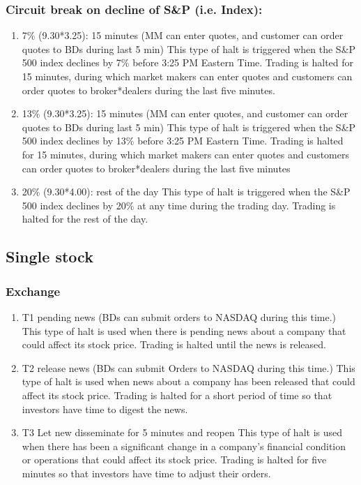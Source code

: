 \documentclass[11pt]{article}
\begin{document}
\subsubsection{Circuit break on decline of S\&P (i.e. Index):}
\label{sec:org32952db}
\begin{enumerate}
\item 7\%  (9.30*3.25): 15 minutes         (MM can enter quotes, and customer can order quotes to BDs during last 5 min)
\label{sec:org6ede6fb}
This type of halt is triggered when the S\&P 500 index declines by 7\% before 3:25 PM Eastern Time. Trading is halted for 15 minutes, during which market makers can enter quotes and customers can order quotes to broker*dealers during the last five minutes.
\item 13\% (9.30*3.25): 15 minutes         (MM can enter quotes, and customer can order quotes to BDs during last 5 min)
\label{sec:org1259ee9}
This type of halt is triggered when the S\&P 500 index declines by 13\% before 3:25 PM Eastern Time. Trading is halted for 15 minutes, during which market makers can enter quotes and customers can order quotes to broker*dealers during the last five minutes
\item 20\% (9.30*4.00): rest of the day
\label{sec:org5681668}
This type of halt is triggered when the S\&P 500 index declines by 20\% at any time during the trading day. Trading is halted for the rest of the day.
\end{enumerate}
\subsection{Single stock}
\label{sec:orgf35e5c6}
\subsubsection{Exchange}
\label{sec:org676dc25}
\begin{enumerate}
\item T1 pending news  (BDs can submit orders to NASDAQ during this time.)
\label{sec:org8b3a272}
This type of halt is used when there is pending news about a company that could affect its stock price. Trading is halted until the news is released.
\item T2 release news   (BDs can submit Orders to NASDAQ during this time.)
\label{sec:orgecbfab3}
This type of halt is used when news about a company has been released that could affect its stock price. Trading is halted for a short period of time so that investors have time to digest the news.
\item T3 Let new disseminate for 5 minutes and reopen
\label{sec:orgb9ad6ab}
This type of halt is used when there has been a significant change in a company's financial condition or operations that could affect its stock price. Trading is halted for five minutes so that investors have time to adjust their orders.
\end{enumerate}
\end{document}

